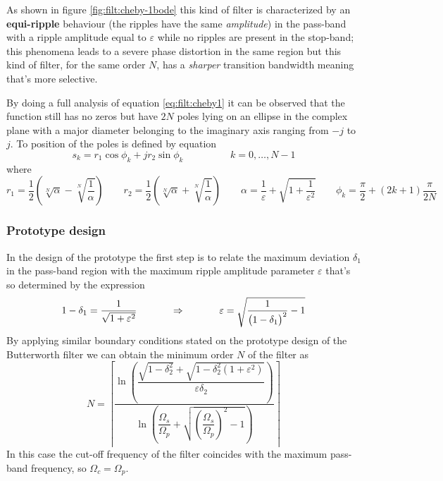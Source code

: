		As shown in figure \ref{fig:filt:cheby-1bode} this kind of filter is characterized by an \textbf{equi-ripple} behaviour (the ripples have the same \textit{amplitude}) in the pass-band with a ripple amplitude equal to $\varepsilon$ while no ripples are present in the stop-band; this phenomena leads to a severe phase distortion in the same region but this kind of filter, for the same order $N$, has a \textit{sharper} transition bandwidth meaning that's more selective.
		
		By doing a full analysis of equation \ref{eq:filt:cheby1} it can be observed that the function still has no zeros but have $2N$ poles lying on an ellipse in the complex plane with a major diameter belonging to the imaginary axis ranging from $-j$ to $j$. To position of the poles is defined by equation
		\begin{equation}
			s_k = r_1 \cos\phi_k + j r_2 \sin\phi_k \hspace{2cm} k = 0,\dots, N-1
		\end{equation}
		where
		\[ r_1 = \frac 1 2 \left( \sqrt[N]\alpha - \sqrt[N]{\frac 1 \alpha} \right) \qquad r_2 = \frac 1 2 \left( \sqrt[N]\alpha + \sqrt[N]{\frac 1 \alpha} \right) \qquad \alpha = \frac 1 \varepsilon + \sqrt{1 + \frac{1}{\varepsilon^2}} \qquad \phi_k = \frac \pi 2 + (2k+1) \frac \pi {2N} \]
	
		\subsubsection{Prototype design}
		In the design of the prototype the first step is to relate the maximum deviation $\delta_1$ in the pass-band region with the maximum ripple amplitude parameter $\varepsilon$ that's so determined by the expression
		\begin{equation}
			1 - \delta_1 = \frac{1}{\sqrt{1+\varepsilon^2}} \hspace{1.2cm} \Rightarrow \hspace{1.2cm} \varepsilon = \sqrt{\frac 1 {\big(1-\delta_1\big)^2} - 1}
		\end{equation}
		By applying similar boundary conditions stated on the prototype design of the Butterworth filter we can obtain the minimum order $N$ of the filter as
		\begin{equation}
			N = \left\lceil \frac{\ln\left( \dfrac{\sqrt{1-\delta_2^2} + \sqrt{1-\delta_2^2(1+\varepsilon^2)}}{\varepsilon\delta_2} \right)}{\ln\left( \dfrac{\Omega_s}{\Omega_p} + \sqrt{\left( \dfrac{\Omega_s}{\Omega_p} \right)^2 - 1} \right)} \right\rceil
		\end{equation}
		In this case the cut-off frequency of the filter coincides with the maximum pass-band frequency, so $\Omega_c=  \Omega_p$.


